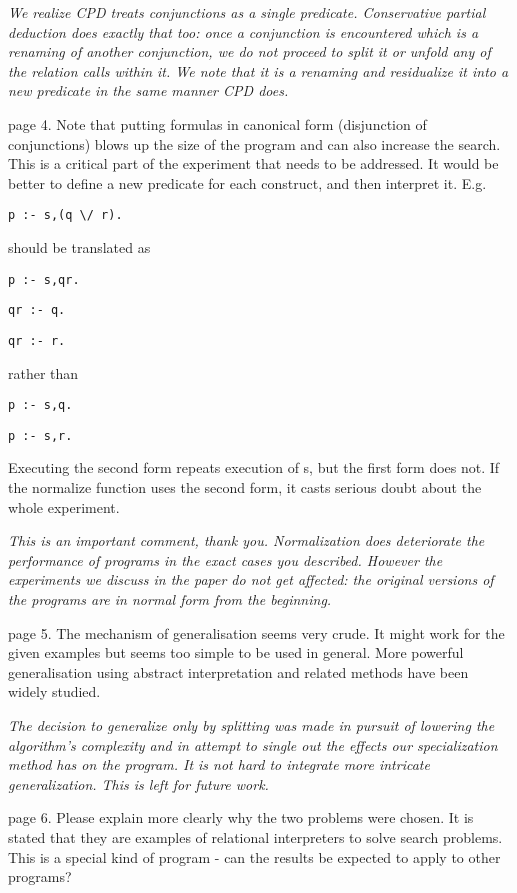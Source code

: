 \emph{We realize CPD treats conjunctions as a single predicate. Conservative partial deduction does exactly that too: once a conjunction is encountered which is a renaming of another conjunction, we do not proceed to split it or unfold any of the relation calls within it. We note that it is a renaming and residualize it into a new predicate in the same manner CPD does.}


page 4.  Note that putting formulas in canonical form (disjunction of conjunctions) blows up the size of the program and can also increase the search.  This is a critical part of the experiment that needs to be addressed.  It would be better to define a new predicate for each construct, and then interpret it.  E.g.

\verb!p :- s,(q \/ r).!

should be translated as

\verb!p :- s,qr.!

\verb!qr :- q.!

\verb!qr :- r.!

rather than

\verb!p :- s,q.!

\verb!p :- s,r.!

Executing the second form repeats execution of s, but the first form does not.  If the normalize function uses the second form, it casts serious doubt about the whole experiment.

\emph{This is an important comment, thank you. Normalization does deteriorate the performance of programs in the exact cases you described. However the experiments we discuss in the paper do not get affected: the original versions of the programs are in normal form from the beginning.}

page 5.  The mechanism of generalisation seems very crude.  It might work for the given examples but seems too simple to be used in general.  More powerful generalisation using abstract interpretation and related methods have been widely studied.

\emph{The decision to generalize only by splitting was made in pursuit of lowering the algorithm's complexity and in attempt to single out the effects our specialization method has on the program. It is not hard to integrate more intricate generalization. This is left for future work. }

page 6.  Please explain more clearly why the two problems were chosen. It is stated that they are examples of relational interpreters to solve search problems. This is a special kind of program - can the results be expected to apply to other programs?

